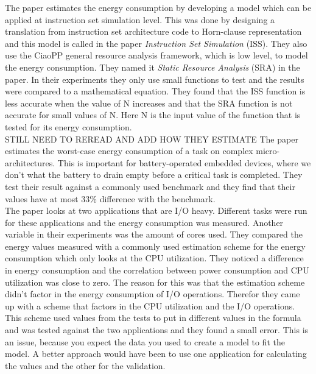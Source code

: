 The paper \cite{liqat2013energy} estimates the energy consumption by developing a model which can be applied at instruction set simulation level. This was done by designing a translation from instruction set architecture code to Horn-clause representation and this model is called in the paper \textit{Instruction Set Simulation} (ISS). They also use the CiaoPP general resource analysis framework, which is low level, to model the energy consumption. They named it \textit{Static Resource Analysis} (SRA) in the paper. In their experiments they only use small functions to test and the results were compared to a mathematical equation. They found that the ISS function is less accurate when the value of N increases and that the SRA function is not accurate for small values of N. Here N is the input value of the function that is tested for its energy consumption.\\

STILL NEED TO REREAD AND ADD HOW THEY ESTIMATE
The paper \cite{jayaseelan2006estimating} estimates the worst-case energy consumption of a task on complex micro-architectures. This is important for battery-operated embedded devices, where we don't what the battery to drain empty before a critical task is completed. They test their result against a commonly used benchmark and they find that their values have at most 33\% difference with the benchmark.\\

The paper \cite{ferreiradasilva-iccs-2019} looks at two applications that are I/O heavy. Different tasks were run for these applications and the energy consumption was measured. Another variable in their experiments was the amount of cores used. They compared the energy values measured with a commonly used estimation scheme for the energy consumption which only looks at the CPU utilization. They noticed a difference in energy consumption and the correlation between power consumption and CPU utilization was close to zero. The reason for this was that the estimation scheme didn't factor in the energy consumption of I/O operations. Therefor they came up with a scheme that factors in the CPU utilization and the I/O operations. This scheme used values from the tests to put in different values in the formula and was tested against the two applications and they found a small error. This is an issue, because you expect the data you used to create a model to fit the model. A better approach would have been to use one application for calculating the values and the other for the validation.\\


